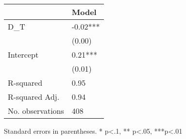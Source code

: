\begin{table}
\caption{}
\label{}
\begin{center}
\begin{tabular}{ll}
\hline
                                 & Model     \\
\hline
D\_T                             & -0.02***  \\
                                 & (0.00)    \\
Intercept                        & 0.21***   \\
                                 & (0.01)    \\
R-squared                        & 0.95      \\
R-squared Adj.                   & 0.94      \\
No. observations                 & 408       \\
\hline
\end{tabular}
Standard errors in parentheses. \newline 
* p<.1, ** p<.05, ***p<.01
\end{center}
\end{table}
